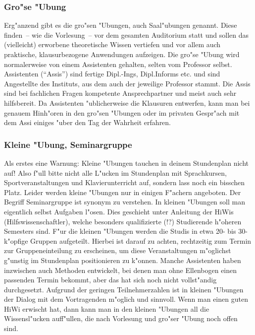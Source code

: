 \subsubsection*{Gro"se "Ubung}

Erg"anzend gibt es die gro"sen "Ubungen, auch Saal"ubungen genannt. Diese
finden~-- wie die Vorlesung~-- vor dem gesamten Auditorium statt und sollen das
(vielleicht) erworbene theoretische Wissen vertiefen und vor allem auch
praktische, klausurbezogene Anwendungen aufzeigen. Die gro"se "Ubung wird
normalerweise von einem Assistenten gehalten, selten vom Professor selbst.
Assistenten ("`Assis"') sind fertige Dipl.-Ings, Dipl.Informs etc. und sind
Angestellte des Instituts, aus dem auch der jeweilige Professor stammt. Die
Assis sind bei fachlichen Fragen kompetente Ansprechpartner und meist auch sehr
hilfsbereit. Da Assistenten "ublicherweise die Klausuren entwerfen, kann man
bei genauem Hinh"oren in den gro"sen "Ubungen oder im privaten Gespr"ach mit
dem Assi einiges "uber den Tag der Wahrheit erfahren.


\subsubsection*{Kleine "Ubung, Seminargruppe}

Als erstes eine Warnung: Kleine "Ubungen tauchen in deinem Stundenplan nicht auf!
Also f"ull bitte nicht alle L"ucken im
Stundenplan mit Sprachkursen, Sportveranstaltungen und Klavierunterricht auf,
sondern lass noch ein bisschen Platz. Leider werden kleine "Ubungen nur in
einigen F"achern angeboten. Der Begriff Seminargruppe ist synonym zu verstehen.
In kleinen "Ubungen soll man eigentlich selbst Aufgaben l"osen. Dies geschieht
unter Anleitung der HiWis (Hilfswissenschaftler), welche besonders qualifizierte
(!?) Studierende h"oheren Semesters sind. F"ur die kleinen "Ubungen werden die
Studis in etwa 20- bis 30-k"opfige Gruppen aufgeteilt. Hierbei ist darauf zu
achten, rechtzeitig zum Termin zur Gruppeneinteilung zu erscheinen, um diese
Veranstaltungen m"oglichst g"unstig im Stundenplan positionieren zu k"onnen.
Manche Assistenten haben inzwischen auch Methoden entwickelt, bei denen man
ohne Ellenbogen einen passenden Termin bekommt, aber das hat sich noch nicht
vollst"andig durchgesetzt. Aufgrund der geringen Teilnehmerzahlen ist in
kleinen "Ubungen der Dialog mit dem Vortragenden m"oglich und sinnvoll. Wenn
man einen guten HiWi erwischt hat, dann kann man in den kleinen "Ubungen all
die Wissensl"ucken auff"ullen, die nach Vorlesung und gro"ser "Ubung noch offen
sind.

